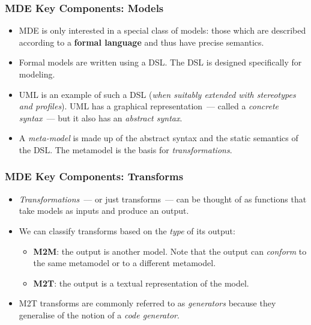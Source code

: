 \documentclass{beamer}
\begin{document}
\begin{frame}
\frametitle{\ac{MDE} Key Components: Models}

\begin{itemize}

\item \ac{MDE} is only interested in a special class of models: those
  which are described according to a \textbf{formal language} and thus
  have precise semantics.

\pause{}

\item Formal models are written using a \acf{DSL}. The \ac{DSL} is
  designed specifically for modeling.

\pause{}

\item \acf{UML} is an example of such a \ac{DSL} (\emph{when suitably
  extended with stereotypes and profiles}). \ac{UML} has a graphical
  representation~--- called a \emph{concrete syntax}~--- but it also
  has an \emph{abstract syntax}.

\pause{}

\item A \emph{meta-model} is made up of the abstract syntax and the
  static semantics of the \ac{DSL}. The metamodel is the basis for
  \emph{transformations}.

\end{itemize}

\end{frame}

\begin{frame}
\frametitle{\ac{MDE} Key Components: Transforms}

\begin{itemize}
\item \emph{Transformations}~--- or just transforms~--- can be thought
  of as functions that take models as inputs and produce an output.

\pause{}

\item We can classify transforms based on the \emph{type} of its
  output:

\pause{}

\begin{itemize}

\item \textbf{\acf{M2M}}: the output is another model. Note that the
  output can \emph{conform} to the same metamodel or to a different
  metamodel.

\pause{}

\item \textbf{\acf{M2T}}: the output is a textual representation of
  the model.

\end{itemize}

\pause{}

\item \ac{M2T} transforms are commonly referred to as
  \emph{generators} because they generalise of the notion of a
  \emph{code generator}.

\end{itemize}

\end{frame}
\end{document}
